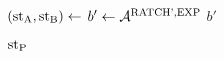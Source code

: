 \algrenewcommand\textproc{}
  \algrenewcommand{}

  \begin{minipage}{.5\linewidth}
    \begin{algorithmic}[1]
      \State $(\text{st}_\text{A},\text{st}_\text{B}) \gets$ 
      \State $b' \gets \mathcal{A}^{\text{RATCH',EXP}}$
      \State \Return $b'$
      \EndProcedure
    \end{algorithmic}
  \end{minipage}

  \vline

  \algrenewcommand\textproc{}
  \algrenewcommand{}

  \begin{minipage}{.5\linewidth}
    \begin{algorithmic}[1]
      \State \Return {}
      \EndProcedure

      \item[] %

      \State \Return $\text{st}_\text{P}$ 
      \EndProcedure
   \end{algorithmic}
 \end{minipage}%
